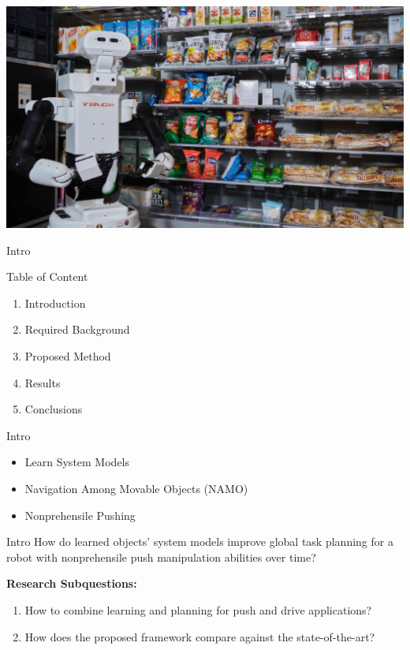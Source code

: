 \begin{frame}[fragile]{} 
\begin{center}
\includegraphics[width=1.0\textwidth]{figures/introduction/robot3}
\end{center}
\end{frame}

\begin{frame}[c]{Intro} 
  \begin{block}{Table of Content}
    \begin{enumerate}
      \item Introduction
      \item Required Background
      \item Proposed Method
      \item Results
      \item Conclusions
    \end{enumerate}
  \end{block}
\end{frame}

\begin{frame}[fragile]{Intro} 
\begin{itemize}
  \item Learn System Models\\\pause
  \item Navigation Among Movable Objects (NAMO)\\\pause
  \item Nonprehensile Pushing
\end{itemize}
\end{frame}

\begin{frame}[fragile]{Intro}
\large
How do learned objects' system models improve global task planning for a robot with nonprehensile push manipulation abilities over time? \bs

\textbf{Research Subquestions:}

\begin{enumerate}
    \item\small How to combine learning and planning for push and drive applications?
    \item\small How does the proposed framework compare against the state-of-the-art?
\end{enumerate}
\end{frame}


